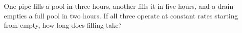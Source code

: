One pipe fills a pool in three hours, another fills it in five hours, and a drain empties a full pool in two hours. If all three operate at constant rates starting from empty, how long does filling take?
